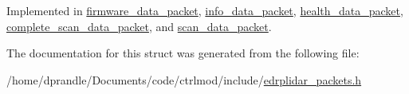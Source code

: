 Implemented in \hyperlink{structfirmware__data__packet_a84cd6f60b9d5ef46ab5c4695d6de3d48}{firmware\-\_\-data\-\_\-packet}, \hyperlink{structinfo__data__packet_a85dfeae92d487d55b6d57e95e0c2b662}{info\-\_\-data\-\_\-packet}, \hyperlink{structhealth__data__packet_abc386acf1fcf42086f1fc791d2718dff}{health\-\_\-data\-\_\-packet}, \hyperlink{structcomplete__scan__data__packet_a144e017cea82952bda749de5692fdf6a}{complete\-\_\-scan\-\_\-data\-\_\-packet}, and \hyperlink{structscan__data__packet_a8401263b8927ca5a67ca23c8797cc67e}{scan\-\_\-data\-\_\-packet}.



The documentation for this struct was generated from the following file\-:\begin{DoxyCompactItemize}
\item 
/home/dprandle/\-Documents/code/ctrlmod/include/\hyperlink{edrplidar__packets_8h}{edrplidar\-\_\-packets.\-h}\end{DoxyCompactItemize}
